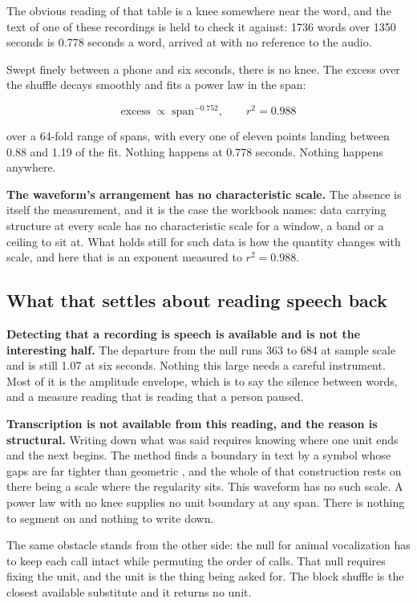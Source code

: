The obvious reading of that table is a knee somewhere near the word, and the text of one of these
recordings is held to check it against: 1736 words over 1350 seconds is 0.778 seconds a word,
arrived at with no reference to the audio.

Swept finely between a phone and six seconds, there is no knee. The excess over the shuffle decays
smoothly and fits a power law in the span:

\[
\text{excess} \;\propto\; \text{span}^{-0.752}, \qquad r^2 = 0.988
\]

over a 64-fold range of spans, with every one of eleven points landing between 0.88 and 1.19 of the
fit. Nothing happens at 0.778 seconds. Nothing happens anywhere.

\textbf{The waveform's arrangement has no characteristic scale.} The absence is itself the
measurement, and it is the case the workbook names: data carrying structure at every scale has no
characteristic scale for a window, a band or a ceiling to sit at. What holds still for such data is
how the quantity changes with scale, and here that is an exponent measured to \(r^2 = 0.988\).

\subsection{What that settles about reading speech back}

\textbf{Detecting that a recording is speech is available and is not the interesting half.} The
departure from the null runs 363 to 684 at sample scale and is still 1.07 at six seconds. Nothing
this large needs a careful instrument. Most of it is the amplitude envelope, which is to say the
silence between words, and a measure reading that is reading that a person paused.

\textbf{Transcription is not available from this reading, and the reason is structural.} Writing down
what was said requires knowing where one unit ends and the next begins. The method finds a boundary
in text by a symbol whose gaps are far tighter than geometric \cite{src:Quigg-delta-null}, and the
whole of that construction rests on there being a scale where the regularity sits. This waveform has
no such scale. A power law with no knee supplies no unit boundary at any span. There is nothing to
segment on and nothing to write down.

The same obstacle stands from the other side: the null for animal vocalization has to keep each call
intact while permuting the order of calls. That null requires fixing the unit, and the unit is the
thing being asked for. The block shuffle is the closest available substitute and it returns no unit.

